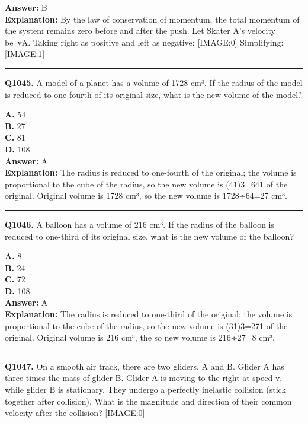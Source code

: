 \documentclass[12pt]{article}
\begin{document}
\textbf{Answer:} B \\
\textbf{Explanation:} By the law of conservation of momentum, the total momentum of the system remains zero before and after the push.
Let Skater A’s velocity be vA. Taking right as positive and left as negative:
[IMAGE:0]
Simplifying:
[IMAGE:1]

\hrule
\vspace{1em}


\noindent
\textbf{Q1045.} A model of a planet has a volume of 1728 cm³. If the radius of the model is reduced to one-fourth of its original size, what is the new volume of the model?



\textbf{A.} 54 \\
\textbf{B.} 27 \\
\textbf{C.} 81 \\
\textbf{D.} 108 \\

\textbf{Answer:} A \\
\textbf{Explanation:} The radius is reduced to one-fourth of the original; the volume is proportional to the cube of the radius, so the new volume is (41)3=641 of the original.
Original volume is 1728 cm³, so the new volume is 1728÷64=27 cm³.

\hrule
\vspace{1em}


\noindent
\textbf{Q1046.} A balloon has a volume of 216 cm³. If the radius of the balloon is reduced to one-third of its original size, what is the new volume of the balloon?



\textbf{A.} 8 \\
\textbf{B.} 24 \\
\textbf{C.} 72 \\
\textbf{D.} 108 \\

\textbf{Answer:} A \\
\textbf{Explanation:} The radius is reduced to one-third of the original; the volume is proportional to the cube of the radius, so the new volume is (31)3=271 of the original.
Original volume is 216 cm³, the so new volume is 216÷27=8 cm³.

\hrule
\vspace{1em}


\noindent
\textbf{Q1047.} On a smooth air track, there are two gliders, A and B. Glider A has three times the mass of glider B. Glider A is moving to the right at speed v, while glider B is stationary. They undergo a perfectly inelastic collision (stick together after collision). What is the magnitude and direction of their common velocity after the collision?
[IMAGE:0]
\end{document}
